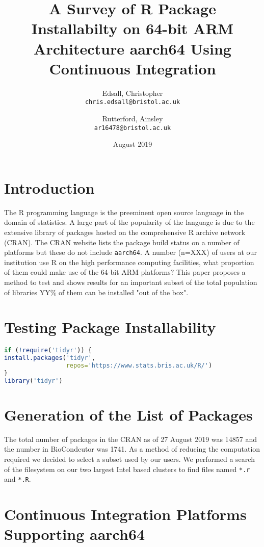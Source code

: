 \documentclass{article}
\title{A Survey of R Package Installabilty on 64-bit ARM Architecture aarch64 Using Continuous Integration}
\author{Edsall, Christopher\\
  \texttt{chris.edsall@bristol.ac.uk}
  \and
  Rutterford, Ainsley\\
  \texttt{ar16478@bristol.ac.uk}
}
\date{August 2019}
\begin{document}
\maketitle

\section{Introduction}
The R programming language\cite{R:Ihaka+Gentleman:1996} is the preeminent open source language in the domain of statistics. A large part of the popularity of the language is due to the extensive library of packages hosted on the comprehensive R archive network (\textsc{CRAN}). The \textsc{CRAN} website lists the package build status on a number of platforms but these do not include \texttt{aarch64}. A number (n=XXX) of users at our institution use R on the high performance computing facilities, what proportion of them could make use of the 64-bit ARM platforms? This paper proposes a method to test and shows results for an important subset of the total population of libraries YY\% of them can be installed "out of the box". 

\section{Testing Package Installability}

\begin{lstlisting}[language=R, caption=Testing that package \texttt{tidyr} can be installed and loaded]
if (!require('tidyr')) {
install.packages('tidyr',
                 repos='https://www.stats.bris.ac.uk/R/')
}
library('tidyr')
\end{lstlisting}


\section{Generation of the List of Packages}

The total number of packages in the \textsc{CRAN} as of 27 August 2019 was 14857 and the number in BioCondcutor was 1741. As a method of reducing the computation required we decided to select a subset used by our users. We performed a search of the filesystem on our two largest Intel based clusters to find files named \texttt{*.r} and \texttt{*.R}.

\section{Continuous Integration Platforms Supporting aarch64}
\end{document}
